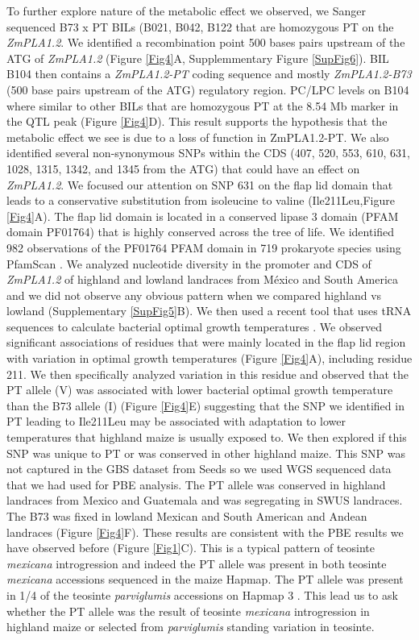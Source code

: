 \documentclass[9pt,twocolumn,twoside]{BioRxiv}
\begin{document}
To further explore nature of the metabolic effect we observed, we Sanger sequenced B73 x PT BILs (B021, B042, B122 that are homozygous PT on the \textit{ZmPLA1.2}.
We identified a recombination point 500 bases pairs upstream of the ATG of \textit{ZmPLA1.2} (Figure \ref{Fig4}A, Supplemmentary Figure \ref{SupFig6}).
BIL B104 then contains a \textit{ZmPLA1.2-PT} coding sequence and mostly \textit{ZmPLA1.2-B73} (500 base pairs upstream of the ATG) regulatory region. 
PC/LPC levels on B104 where similar to other BILs that are homozygous PT at the 8.54 Mb marker in the QTL peak (Figure \ref{Fig4}D). 
This result supports the hypothesis that the metabolic effect we see is due to a loss of function in ZmPLA1.2-PT. 
We also identified several non-synonymous SNPs within the CDS (407, 520, 553, 610, 631, 1028, 1315, 1342, and 1345 from the ATG) that could have an effect on \textit{ZmPLA1.2}.
We focused our attention on SNP 631 on the flap lid domain that leads to a conservative substitution from isoleucine to valine (Ile211Leu,Figure \ref{Fig4}A).  
The flap lid domain is located in a conserved lipase 3 domain (PFAM domain PF01764) that is highly conserved across the tree of life. 
We identified 982 observations of the PF01764 PFAM domain in 719 prokaryote species using PfamScan \cite{Potter2018-tk, El-Gebali2019-pw}.
We analyzed nucleotide diversity in the promoter and CDS of \textit{ZmPLA1.2} of highland and lowland landraces from México and South America and we did not observe any obvious pattern  when we compared highland vs lowland (Supplementary \ref{SupFig5}B). 
We then used a recent tool that uses tRNA sequences to calculate bacterial optimal growth temperatures \cite{Cimen2020-dm}.
We observed significant associations of residues that were mainly located in the flap lid region with variation in optimal growth temperatures (Figure \ref{Fig4}A), including residue 211. 
We then specifically analyzed variation in this residue and observed that the PT allele (V) was associated with lower bacterial optimal growth temperature than the B73 allele (I) (Figure \ref{Fig4}E) suggesting that the SNP we identified in PT leading to Ile211Leu may be associated with adaptation to lower temperatures that highland maize is usually exposed to. 
We then explored if this SNP was unique to PT or was conserved in other highland maize.
This SNP was not captured in the GBS dataset from Seeds so we used WGS sequenced data that we had used for PBE analysis. 
The PT allele was conserved in highland landraces from Mexico and Guatemala and was segregating in SWUS landraces. The B73 was fixed in lowland Mexican and South American and Andean landraces (Figure \ref{Fig4}F). 
These results are consistent with the PBE results we have observed before (Figure \ref{Fig1}C).
This is a typical pattern of teosinte \textit{mexicana} introgression \cite{Wang2020-mp} and indeed the PT allele was present in both teosinte \textit{mexicana} accessions sequenced in the maize Hapmap. 
The PT allele was present in 1/4 of the teosinte \textit{parviglumis} accessions on Hapmap 3 \cite{Bukowski2017-ng}. 
This lead us to ask whether the PT allele was the result of teosinte \textit{mexicana} introgression in highland maize or selected from \textit{parviglumis} standing variation in teosinte. 
\end{document}
